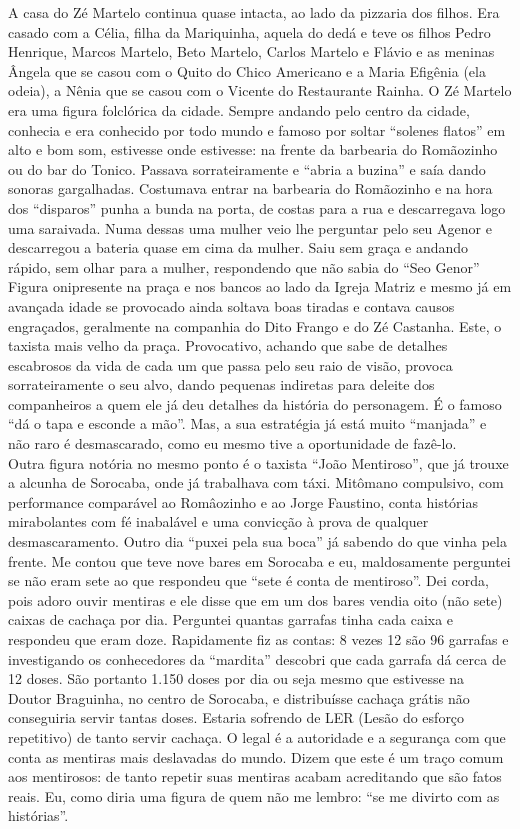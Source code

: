 \documentclass[12pt,brazil,]{book}
\begin{document}
A casa do Zé Martelo continua quase intacta, ao lado da pizzaria dos
filhos. Era casado com a Célia, filha da Mariquinha, aquela do dedá e
teve os filhos Pedro Henrique, Marcos Martelo, Beto Martelo, Carlos
Martelo e Flávio e as meninas Ângela que se casou com o Quito do Chico
Americano e a Maria Efigênia (ela odeia), a Nênia que se casou com o
Vicente do Restaurante Rainha. O Zé Martelo era uma figura folclórica da
cidade. Sempre andando pelo centro da cidade, conhecia e era conhecido
por todo mundo e famoso por soltar ``solenes flatos'' em alto e bom som,
estivesse onde estivesse: na frente da barbearia do Romãozinho ou do bar
do Tonico. Passava sorrateiramente e ``abria a buzina'' e saía dando
sonoras gargalhadas. Costumava entrar na barbearia do Romãozinho e na
hora dos ``disparos'' punha a bunda na porta, de costas para a rua e
descarregava logo uma saraivada. Numa dessas uma mulher veio lhe
perguntar pelo seu Agenor e descarregou a bateria quase em cima da
mulher. Saiu sem graça e andando rápido, sem olhar para a mulher,
respondendo que não sabia do ``Seo Genor'' Figura onipresente na praça e
nos bancos ao lado da Igreja Matriz e mesmo já em avançada idade se
provocado ainda soltava boas tiradas e contava causos engraçados,
geralmente na companhia do Dito Frango e do Zé Castanha. Este, o taxista
mais velho da praça. Provocativo, achando que sabe de detalhes
escabrosos da vida de cada um que passa pelo seu raio de visão, provoca
sorrateiramente o seu alvo, dando pequenas indiretas para deleite dos
companheiros a quem ele já deu detalhes da história do personagem. É o
famoso ``dá o tapa e esconde a mão''. Mas, a sua estratégia já está
muito ``manjada'' e não raro é desmascarado, como eu mesmo tive a
oportunidade de fazê-lo.\\
Outra figura notória no mesmo ponto é o taxista ``João Mentiroso'', que
já trouxe a alcunha de Sorocaba, onde já trabalhava com táxi. Mitômano
compulsivo, com performance comparável ao Româozinho e ao Jorge
Faustino, conta histórias mirabolantes com fé inabalável e uma convicção
à prova de qualquer desmascaramento. Outro dia ``puxei pela sua boca''
já sabendo do que vinha pela frente. Me contou que teve nove bares em
Sorocaba e eu, maldosamente perguntei se não eram sete ao que respondeu
que ``sete é conta de mentiroso''. Dei corda, pois adoro ouvir mentiras
e ele disse que em um dos bares vendia oito (não sete) caixas de cachaça
por dia. Perguntei quantas garrafas tinha cada caixa e respondeu que
eram doze. Rapidamente fiz as contas: 8 vezes 12 são 96 garrafas e
investigando os conhecedores da ``mardita'' descobri que cada garrafa dá
cerca de 12 doses. São portanto 1.150 doses por dia ou seja mesmo que
estivesse na Doutor Braguinha, no centro de Sorocaba, e distribuísse
cachaça grátis não conseguiria servir tantas doses. Estaria sofrendo de
LER (Lesão do esforço repetitivo) de tanto servir cachaça. O legal é a
autoridade e a segurança com que conta as mentiras mais deslavadas do
mundo. Dizem que este é um traço comum aos mentirosos: de tanto repetir
suas mentiras acabam acreditando que são fatos reais. Eu, como diria uma
figura de quem não me lembro: ``se me divirto com as histórias''.
\end{document}
